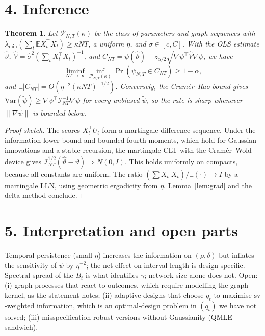 \documentclass[11pt]{article}
\newtheorem{theorem}{Theorem}
\theoremstyle{definition}
\begin{document}
\section*{4. Inference}
\begin{theorem}\label{thm:ci}
Let $\mathcal P_{N,T}(\kappa)$ be the class of parameters and graph sequences with
$\lambda_{\min}(\sum_t\mathbb E X_t^\top X_t)\ge\kappa NT$, a uniform $\eta$, and $\sigma\in[c,C]$. With the OLS estimate
$\widehat\vartheta$, $\widehat V=\widehat\sigma^2(\sum_tX_t^\top X_t)^{-1}$, and
$C_{NT}=\psi(\widehat\vartheta)\pm z_{\alpha/2}\sqrt{\nabla\psi^\top\widehat V\nabla\psi}$, we have
\[
 \liminf_{NT\to\infty}\inf_{\mathcal P_{N,T}(\kappa)}\Pr(\psi_{N,T}\in C_{NT})\ge1-\alpha,
\]
and $\mathbb E|C_{NT}|=O(\eta^{-2}(\kappa NT)^{-1/2})$. Conversely, the Cram\'er--Rao bound gives
$\mathrm{Var}(\widetilde\psi)\ge\nabla\psi^\top\mathcal I_{NT}^{-1}\nabla\psi$ for every unbiased $\widetilde\psi$, so the
rate is sharp whenever $\|\nabla\psi\|$ is bounded below.
\end{theorem}
\begin{proof}[Proof sketch]
The scores $X_t^\top U_t$ form a martingale difference sequence. Under the information lower bound and bounded fourth
moments, which hold for Gaussian innovations and a stable recursion, the martingale CLT with the Cram\'er--Wold device gives
$\mathcal I_{NT}^{1/2}(\widehat\vartheta-\vartheta)\Rightarrow N(0,I)$. This holds uniformly on compacts, because all
constants are uniform. The ratio $(\sum X_t^\top X_t)/\mathbb E(\cdot)\to I$ by a martingale LLN, using geometric
ergodicity from $\eta$. Lemma~\ref{lem:grad} and the delta method conclude.
\end{proof}

\section*{5. Interpretation and open parts}
Temporal persistence (small $\eta$) increases the information on $(\rho,\delta)$ but inflates the sensitivity of $\psi$ by
$\eta^{-2}$; the net effect on interval length is design-specific. Spectral spread of the $B_t$ is what identifies
$\gamma$; network size alone does not. Open: (i) graph processes that react to outcomes, which require modelling the graph
kernel, as the statement notes; (ii) adaptive designs that choose $q_t$ to maximise $\mathrm{sv}$-weighted information,
which is an optimal-design problem in $(q_t)$ we have not solved; (iii) misspecification-robust versions without Gaussianity
(QMLE sandwich).
\end{document}
